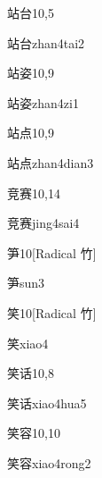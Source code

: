 \begin{entry}{站台}{10,5}
  \begin{phonetics}{站台}{zhan4tai2}
  \end{phonetics}
\end{entry}

\begin{entry}{站姿}{10,9}
  \begin{phonetics}{站姿}{zhan4zi1}
  \end{phonetics}
\end{entry}

\begin{entry}{站点}{10,9}
  \begin{phonetics}{站点}{zhan4dian3}
  \end{phonetics}
\end{entry}

\begin{entry}{竞赛}{10,14}
  \begin{phonetics}{竞赛}{jing4sai4}
  \end{phonetics}
\end{entry}

\begin{entry}{笋}{10}[Radical 竹]
  \begin{phonetics}{笋}{sun3}
  \end{phonetics}
\end{entry}

\begin{entry}{笑}{10}[Radical 竹]
  \begin{phonetics}{笑}{xiao4}
  \end{phonetics}
\end{entry}

\begin{entry}{笑话}{10,8}
  \begin{phonetics}{笑话}{xiao4hua5}
  \end{phonetics}
\end{entry}

\begin{entry}{笑容}{10,10}
  \begin{phonetics}{笑容}{xiao4rong2}
  \end{phonetics}
\end{entry}

